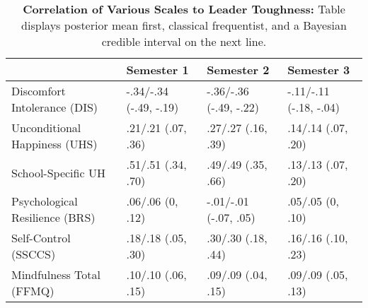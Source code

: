 \begin{table}[ht]
\centering
\begin{tabular}{llll}
  \hline
 & Semester 1 & Semester 2 & Semester 3 \\ 
  \hline
Discomfort Intolerance (DIS) & -.34/-.34 (-.49, -.19) & -.36/-.36 (-.49, -.22) & -.11/-.11 (-.18, -.04) \\ 
  Unconditional Happiness (UHS) & .21/.21 (.07, .36) & .27/.27 (.16, .39) & .14/.14 (.07, .20) \\ 
  School-Specific UH & .51/.51 (.34, .70) & .49/.49 (.35, .66) & .13/.13 (.07, .20) \\ 
  Psychological Resilience (BRS) & .06/.06 (0, .12) & -.01/-.01 (-.07, .05) & .05/.05 (0, .10) \\ 
  Self-Control (SSCCS) & .18/.18 (.05, .30) & .30/.30 (.18, .44) & .16/.16 (.10, .23) \\ 
  Mindfulness Total (FFMQ) & .10/.10 (.06, .15) & .09/.09 (.04, .15) & .09/.09 (.05, .13) \\ 
   \hline
\end{tabular}
\caption{\textbf{Correlation of Various Scales to Leader Toughness:} Table displays posterior mean first, classical frequentist, and a Bayesian credible interval on the next line.} 
\label{tab:edc_corr}
\end{table}
